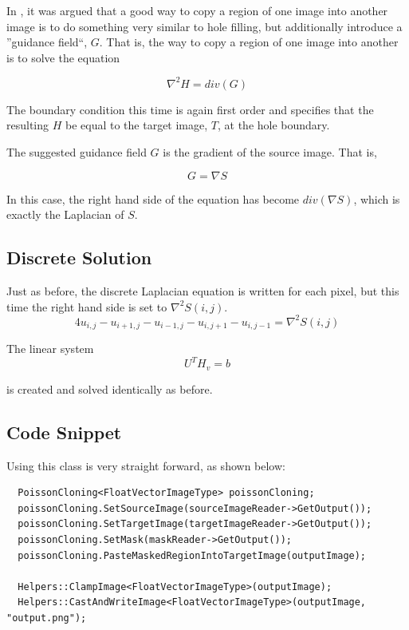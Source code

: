 \documentclass{InsightArticle}
\begin{document}
In \cite{PoissonImageEditing}, it was argued that a good way to copy a region of one image into another image is to do something very similar to hole filling, but additionally introduce a ''guidance field``, $G$. That is, the way to copy a region of one image into another is to solve the equation

\begin{equation}
\nabla^2 H = div(G)
\end{equation}

The boundary condition this time is again first order and specifies that the resulting $H$ be equal to the target image, $T$, at the hole boundary.

The suggested guidance field $G$ is the gradient of the source image. That is,

\begin{equation}
G = \nabla S
\end{equation}

In this case, the right hand side of the equation has become $div(\nabla S)$, which is exactly the Laplacian of $S$.

\subsection{Discrete Solution}
Just as before, the discrete Laplacian equation is written for each pixel, but this time the right hand side is set to $\nabla^2 S(i,j)$.
\begin{equation}
\label{eqn:DiscreteLaplacian}
4 u_{i,j} - u_{i+1,j} - u_{i-1,j} - u_{i,j+1} - u_{i,j-1} = \nabla^2 S(i,j)
\end{equation}

The linear system 
\begin{equation}
 U^T H_v = b
\end{equation}

is created and solved identically as before.

\subsection{Code Snippet}

Using this class is very straight forward, as shown below:

\begin{verbatim}
  PoissonCloning<FloatVectorImageType> poissonCloning;
  poissonCloning.SetSourceImage(sourceImageReader->GetOutput());
  poissonCloning.SetTargetImage(targetImageReader->GetOutput());
  poissonCloning.SetMask(maskReader->GetOutput());
  poissonCloning.PasteMaskedRegionIntoTargetImage(outputImage);

  Helpers::ClampImage<FloatVectorImageType>(outputImage);
  Helpers::CastAndWriteImage<FloatVectorImageType>(outputImage, "output.png");
\end{verbatim}
\end{document}
